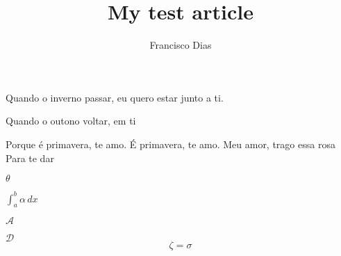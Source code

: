 \documentclass{article}
\title{My test article}
\author{Francisco Dias}
\begin{document}
    
Quando o inverno passar, eu quero estar junto a ti.

Quando o outono voltar, em ti

Porque é primavera, te amo.
É primavera, te amo.
Meu amor, trago essa rosa
Para te dar

$\theta$

$\int_{a}^{b} \alpha \,dx$

$ \mathcal{A} $

$\mathcal{D} $
\begin{equation}
    \zeta=\sigma
\end{equation}
\end{document}
